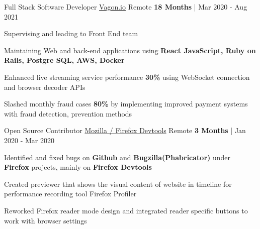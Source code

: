 
\begin{cventries}
  \cvexpentry
   {Full Stack Software Developer
   } %
    {\href{https://vagon.io}{Vagon.io}} %
    {Remote} %
    {\textbf{18 Months} | Mar 2020 - Aug 2021} %
    {
      \begin{cvitems} %
        \item {Supervising and leading to Front End team} 
        \item {Maintaining Web and back-end applications using \textbf{ React JavaScript, Ruby on Rails, Postgre SQL, AWS, Docker}}
		\item {Enhanced live streaming service performance \textbf{30\%} using WebSocket connection and browser decoder APIs}
		\item {Slashed monthly fraud cases \textbf{80\%} by implementing improved payment systems with fraud detection, prevention methods}
      \end{cvitems}
    }
  \cvexpentry
   {Open Source Contributor} %
    {\href{https://www.mozilla.org}{Mozilla / Firefox Devtools}} %
    {Remote} %
    {\textbf{3 Months} | Jan 2020 - Mar 2020} %
    {
      \begin{cvitems} %
        \item {Identified and fixed bugs on \textbf{Github} and \textbf{Bugzilla(Phabricator)} under \textbf{Firefox} projects, mainly on \textbf{Firefox Devtools}}
        \item {Created previewer that shows the visual content of website in timeline for performance recording tool Firefox Profiler
        \item {Reworked Firefox reader mode design and integrated reader specific buttons to work with browser settings}
}
      \end{cvitems}
    }

\end{cventries}
